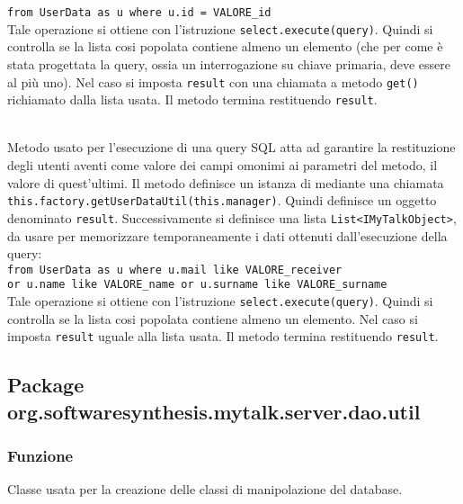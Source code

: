 \begin{description}
	\verb|from UserData as u where u.id = VALORE_id|\\
	
	Tale operazione si ottiene con l'istruzione \verb|select.execute(query)|. Quindi si controlla se la lista cosi popolata contiene almeno un elemento (che per come è stata progettata la query, ossia un interrogazione su chiave primaria, deve essere al più uno). Nel caso si imposta \texttt{result} con una chiamata a metodo \texttt{get()} richiamato dalla lista usata. Il metodo termina restituendo \texttt{result}.
	
	\item{}\\
	Metodo usato per l'esecuzione di una query SQL atta ad garantire la restituzione degli utenti aventi come valore dei campi omonimi ai parametri del metodo, il valore di quest'ultimi. Il metodo definisce un istanza di  mediante una chiamata \\ \verb|this.factory.getUserDataUtil(this.manager)|. Quindi definisce un oggetto  denominato \texttt{result}. Successivamente si definisce una lista \texttt{List<IMyTalkObject>}, da usare per memorizzare temporaneamente i dati ottenuti dall'esecuzione della query:\\
	
	\verb|from UserData as u where u.mail like VALORE_receiver|\\
	\verb|or u.name like VALORE_name or u.surname like VALORE_surname|\\
	
	Tale operazione si ottiene con l'istruzione \verb|select.execute(query)|. Quindi si controlla se la lista cosi popolata contiene almeno un elemento. Nel caso si imposta \texttt{result} uguale alla lista usata. Il metodo termina restituendo \texttt{result}.
	
\end{description}

\subsection{Package org.softwaresynthesis.mytalk.server.dao.util}\label{sec:daoUtil}


\subsubsection*{Funzione}
Classe usata per la creazione delle classi di manipolazione del database.

